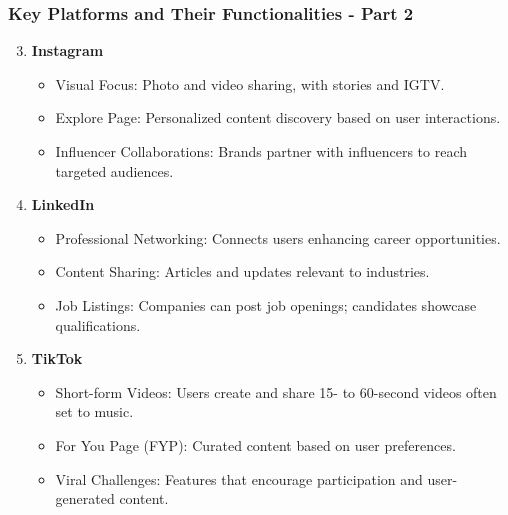 \documentclass{beamer}
\begin{document}
\begin{frame}[fragile]
    \frametitle{Key Platforms and Their Functionalities - Part 2}
    \begin{enumerate}
        \setcounter{enumi}{2} %
        \item \textbf{Instagram}
            \begin{itemize}
                \item Visual Focus: Photo and video sharing, with stories and IGTV.
                \item Explore Page: Personalized content discovery based on user interactions.
                \item Influencer Collaborations: Brands partner with influencers to reach targeted audiences.
            \end{itemize}
        
        \item \textbf{LinkedIn}
            \begin{itemize}
                \item Professional Networking: Connects users enhancing career opportunities.
                \item Content Sharing: Articles and updates relevant to industries.
                \item Job Listings: Companies can post job openings; candidates showcase qualifications.
            \end{itemize}
        
        \item \textbf{TikTok}
            \begin{itemize}
                \item Short-form Videos: Users create and share 15- to 60-second videos often set to music.
                \item For You Page (FYP): Curated content based on user preferences.
                \item Viral Challenges: Features that encourage participation and user-generated content.
            \end{itemize}
    \end{enumerate}
\end{frame}
\end{document}
